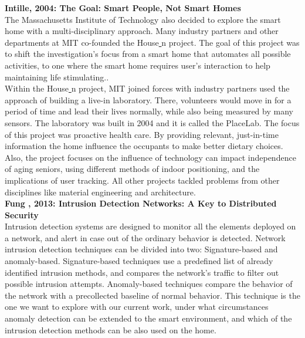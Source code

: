 \textbf{Intille, 2004: The Goal: Smart People, Not Smart Homes} \cite{smartpeople} \\
The Massachusetts Institute of Technology also decided to explore the smart home with a multi-disciplinary approach. Many industry partners and other departments at MIT co-founded the House\underline{ }n project. The goal of this project \cite{smartpeople} was to shift the investigation's focus from a smart home that automates all possible activities, to one where the smart home requires user's interaction to help maintaining life stimulating.\cite{smartpeople}.\\
Within the House\underline{ }n project, MIT joined forces with industry partners used the approach of building a live-in laboratory. There, volunteers would move in for a period of time and lead their lives normally, while also being measured by many sensors. The laboratory was built in 2004 and it is called the PlaceLab\cite{placelab}. 
The focus of this project\cite{placelab} was proactive health care. By providing relevant, just-in-time information\cite{dietary} the home influence the occupants to make better dietary choices. Also, the project focuses on the influence of technology can impact independence of aging seniors\cite{aginginplace}, using different methods of indoor positioning\cite{bhack}, and the implications of user tracking\cite{info:doi/10.2196/jmir.8.4.e29}. All other projects tackled problems from other disciplines like material engineering and architecture.\\

\textbf{Fung \etAl, 2013: Intrusion Detection Networks: A Key to Distributed Security} \cite{fung2013CRC} \\
Intrusion detection systems are designed to monitor all the elements deployed on a network, and alert in case out of the ordinary behavior is detected. Network intrusion detection techniques can be divided into two: Signature-based and anomaly-based\cite{fung2013CRC}. Signature-based techniques use a predefined list of already identified intrusion methods, and compares the network's traffic to filter out possible intrusion attempts. Anomaly-based techniques compare the behavior of the network with a precollected baseline of normal behavior. This technique is the one we want to explore with our current work, under what circumstances anomaly detection can be extended to the smart environment, and which of the intrusion detection methods can be also used on the home.\\
 
